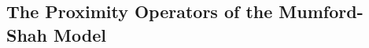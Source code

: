 

    \subsection{The Proximity Operators of the Mumford-Shah Model} %
    \label{sub:the_proximity_operators_of_the_mumford_shah_model}
        
